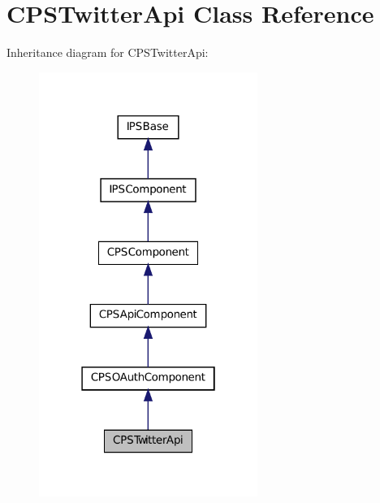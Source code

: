 \hypertarget{classCPSTwitterApi}{
\section{CPSTwitterApi Class Reference}
\label{classCPSTwitterApi}
}


Inheritance diagram for CPSTwitterApi:\nopagebreak
\begin{figure}[H]
\begin{center}
\leavevmode
\includegraphics[width=202pt]{classCPSTwitterApi__inherit__graph}
\end{center}
\end{figure}



